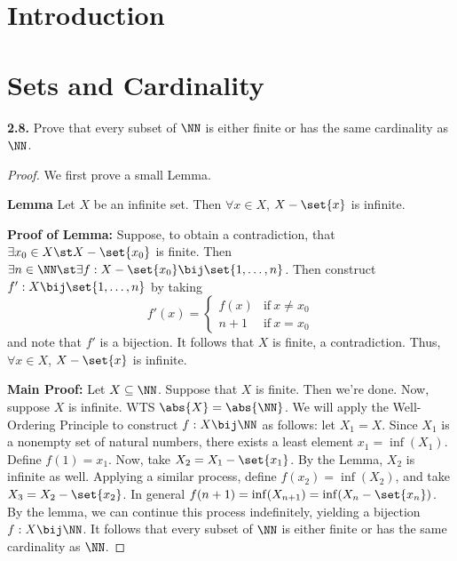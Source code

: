 \documentclass{fkbook}
\newenvironment{problem}[1][Problem \thesection.]
{\begin{boxedminipage}{\linewidth}\textbf{#1.}}
{\end{boxedminipage}}
\begin{document}
\pagestyle{plain}
\frontmatter


\maketitlepage
\tableofcontents
\mainmatter
\chapter{Introduction}
\pagestyle{main}

\chapter{Sets and Cardinality}
\begin{problem}[2.8]
  Prove that every subset of $\NN$ is either finite or has the same cardinality
  as $\NN$.
\end{problem}
\begin{proof}
  We first prove a small Lemma.

  \textbf{Lemma} Let $X$ be an infinite set. Then $\forall x \in X$, $X -
  \set{x}$ is infinite.

  \textbf{Proof of Lemma:} Suppose, to obtain a contradiction, that $\exists x_0
  \in X \st X - \set{x_0}$ is finite. Then $\exists n \in \NN \st \exists f : X
  - \set{x_0} \bij \set{1, \ldots, n}$. Then construct $f' : X \bij \set{1,
    \ldots, n}$ by taking
  \[
    f'(x) =
    \begin{cases}
      f(x) & \text{if}\ x \neq x_0 \\
      n+1 & \text{if}\ x = x_0
    \end{cases}
  \]
  and note that $f'$ is a bijection. It follows that $X$ is finite, a
  contradiction. Thus, $\forall x \in X$, $X - \set{x}$ is infinite.

  \textbf{Main Proof:}
  Let $X \subseteq \NN$. Suppose that $X$ is finite. Then we're done. Now,
  suppose $X$ is infinite. WTS $\abs{X} = \abs{\NN}$. We will apply the
  Well-Ordering Principle to construct $f : X \bij \NN$ as follows: let $X_1 =
  X$. Since $X_1$ is a nonempty set of natural numbers, there exists a least
  element $x_1 = \inf(X_1)$. Define $f(1) = x_1$. Now, take $X_2 = X_1 -
  \set{x_1}$. By the Lemma, $X_2$ is infinite as well. Applying a similar
  process, define $f(x_2) = \inf(X_2)$, and take $X_3 = X_2 - \set{x_2}$.
  In general $f(n+1) = \inf (X_{n+1}) = \inf (X_n - \set{x_n})$. By the lemma,
  we can continue this process indefinitely, yielding a bijection $f : X \bij
  \NN$. It follows that every subset of $\NN$ is either finite or has the same
  cardinality as $\NN$.
\end{proof}
\end{document}
